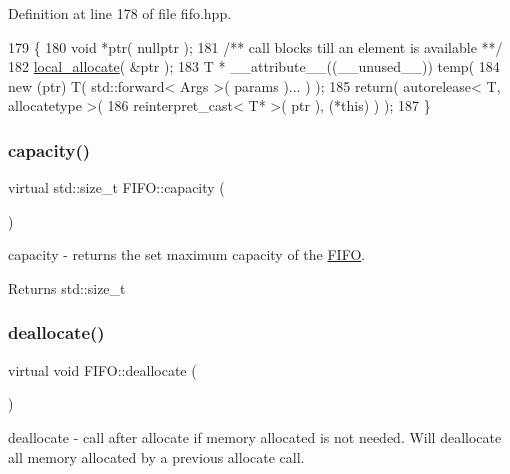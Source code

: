 Definition at line 178 of file fifo.\+hpp.


\begin{DoxyCode}
179    \{
180       \textcolor{keywordtype}{void} *ptr( \textcolor{keyword}{nullptr} );\textcolor{comment}{}
181 \textcolor{comment}{      /** call blocks till an element is available **/}
182       \hyperlink{class_f_i_f_o_a60068cb00b13626e41d4b11099354ae3}{local\_allocate}( &ptr );
183       T * \_\_attribute\_\_((\_\_unused\_\_)) temp( 
184          new (ptr) T( std::forward< Args >( params )... ) );
185       return( autorelease< T, allocatetype >( 
186          reinterpret\_cast< T* >( ptr ), (*this) ) );
187    \}
\end{DoxyCode}
\hypertarget{class_f_i_f_o_a64565d7156f6796ff14c3033387043b1}{}\label{class_f_i_f_o_a64565d7156f6796ff14c3033387043b1} 
\subsubsection{\texorpdfstring{capacity()}{capacity()}}
{\footnotesize\ttfamily virtual std\+::size\+\_\+t F\+I\+F\+O\+::capacity (\begin{DoxyParamCaption}{ }\end{DoxyParamCaption})\hspace{0.3cm}{\ttfamily [pure virtual]}}

capacity -\/ returns the set maximum capacity of the \hyperlink{class_f_i_f_o}{F\+I\+FO}. \begin{DoxyReturn}{Returns}
std\+::size\+\_\+t 
\end{DoxyReturn}
\hypertarget{class_f_i_f_o_af37b9a289093791f4bb9e4ef4e4e271a}{}\label{class_f_i_f_o_af37b9a289093791f4bb9e4ef4e4e271a} 
\subsubsection{\texorpdfstring{deallocate()}{deallocate()}}
{\footnotesize\ttfamily virtual void F\+I\+F\+O\+::deallocate (\begin{DoxyParamCaption}{ }\end{DoxyParamCaption})\hspace{0.3cm}{\ttfamily [pure virtual]}}

deallocate -\/ call after allocate if memory allocated is not needed. Will deallocate all memory allocated by a previous allocate call. \hypertarget{class_f_i_f_o_a4d44784c43a4026508e85982eb3174c7}{}\label{class_f_i_f_o_a4d44784c43a4026508e85982eb3174c7} 
